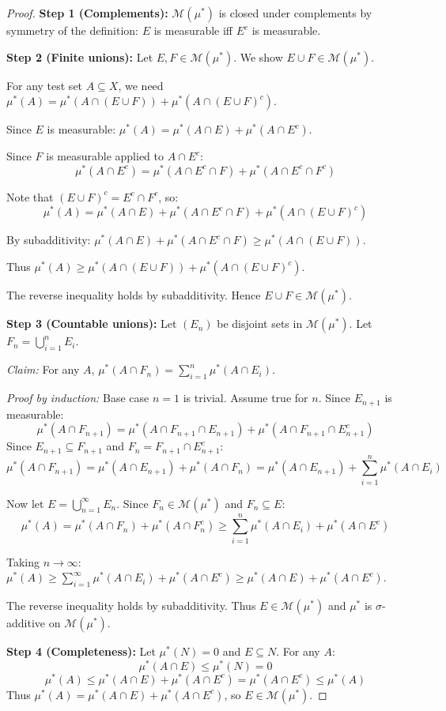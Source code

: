 \begin{proof}
\textbf{Step 1 (Complements):} $\mathcal{M}(\mu^*)$ is closed under complements by symmetry of the definition: $E$ is measurable iff $E^c$ is measurable.

\textbf{Step 2 (Finite unions):} Let $E, F \in \mathcal{M}(\mu^*)$. We show $E \cup F \in \mathcal{M}(\mu^*)$.

For any test set $A \subseteq X$, we need $\mu^*(A) = \mu^*(A \cap (E \cup F)) + \mu^*(A \cap (E \cup F)^c)$.

Since $E$ is measurable: $\mu^*(A) = \mu^*(A \cap E) + \mu^*(A \cap E^c)$.

Since $F$ is measurable applied to $A \cap E^c$:
\[ \mu^*(A \cap E^c) = \mu^*(A \cap E^c \cap F) + \mu^*(A \cap E^c \cap F^c) \]

Note that $(E \cup F)^c = E^c \cap F^c$, so:
\[ \mu^*(A) = \mu^*(A \cap E) + \mu^*(A \cap E^c \cap F) + \mu^*(A \cap (E \cup F)^c) \]

By subadditivity: $\mu^*(A \cap E) + \mu^*(A \cap E^c \cap F) \geq \mu^*(A \cap (E \cup F))$.

Thus $\mu^*(A) \geq \mu^*(A \cap (E \cup F)) + \mu^*(A \cap (E \cup F)^c)$.

The reverse inequality holds by subadditivity. Hence $E \cup F \in \mathcal{M}(\mu^*)$.

\textbf{Step 3 (Countable unions):} Let $(E_n)$ be disjoint sets in $\mathcal{M}(\mu^*)$. Let $F_n = \bigcup_{i=1}^n E_i$.

\textit{Claim:} For any $A$, $\mu^*(A \cap F_n) = \sum_{i=1}^n \mu^*(A \cap E_i)$.

\textit{Proof by induction:} Base case $n=1$ is trivial. Assume true for $n$. Since $E_{n+1}$ is measurable:
\[ \mu^*(A \cap F_{n+1}) = \mu^*(A \cap F_{n+1} \cap E_{n+1}) + \mu^*(A \cap F_{n+1} \cap E_{n+1}^c) \]
Since $E_{n+1} \subseteq F_{n+1}$ and $F_n = F_{n+1} \cap E_{n+1}^c$:
\[ \mu^*(A \cap F_{n+1}) = \mu^*(A \cap E_{n+1}) + \mu^*(A \cap F_n) = \mu^*(A \cap E_{n+1}) + \sum_{i=1}^n \mu^*(A \cap E_i) \]

Now let $E = \bigcup_{n=1}^\infty E_n$. Since $F_n \in \mathcal{M}(\mu^*)$ and $F_n \subseteq E$:
\[ \mu^*(A) = \mu^*(A \cap F_n) + \mu^*(A \cap F_n^c) \geq \sum_{i=1}^n \mu^*(A \cap E_i) + \mu^*(A \cap E^c) \]

Taking $n \to \infty$: $\mu^*(A) \geq \sum_{i=1}^\infty \mu^*(A \cap E_i) + \mu^*(A \cap E^c) \geq \mu^*(A \cap E) + \mu^*(A \cap E^c)$.

The reverse inequality holds by subadditivity. Thus $E \in \mathcal{M}(\mu^*)$ and $\mu^*$ is $\sigma$-additive on $\mathcal{M}(\mu^*)$.

\textbf{Step 4 (Completeness):} Let $\mu^*(N) = 0$ and $E \subseteq N$. For any $A$:
\[ \mu^*(A \cap E) \leq \mu^*(N) = 0 \]
\[ \mu^*(A) \leq \mu^*(A \cap E) + \mu^*(A \cap E^c) = \mu^*(A \cap E^c) \leq \mu^*(A) \]
Thus $\mu^*(A) = \mu^*(A \cap E) + \mu^*(A \cap E^c)$, so $E \in \mathcal{M}(\mu^*)$.
\end{proof}

